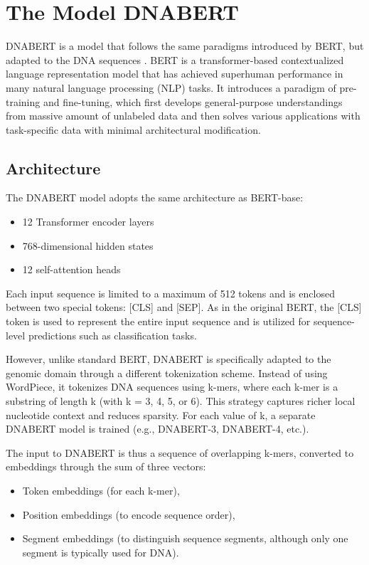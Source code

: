 \section{The Model DNABERT}

DNABERT is a model that follows the same paradigms introduced by BERT, but adapted to the DNA sequences \cite{DBLP:journals/corr/abs-1810-04805}.
BERT is a transformer-based contextualized language representation model that has achieved superhuman performance in many natural language processing (NLP) tasks. It introduces a paradigm of pre-training and fine-tuning, which first develops general-purpose understandings from massive amount of unlabeled data and then solves various applications with task-specific data with minimal architectural modification.


\subsection{Architecture}

The DNABERT model adopts the same architecture as BERT-base:
\begin{itemize}
    \item 12 Transformer encoder layers
    \item 768-dimensional hidden states
    \item 12 self-attention heads
\end{itemize} 

Each input sequence is limited to a maximum of 512 tokens and is enclosed between two special tokens: [CLS] and [SEP]. As in the original BERT, the [CLS] token is used to represent the entire input sequence and is utilized for sequence-level predictions such as classification tasks.

However, unlike standard BERT, DNABERT is specifically adapted to the genomic domain through a different tokenization scheme. Instead of using WordPiece, it tokenizes DNA sequences using k-mers, where each k-mer is a substring of length k (with k = 3, 4, 5, or 6). This strategy captures richer local nucleotide context and reduces sparsity. For each value of k, a separate DNABERT model is trained (e.g., DNABERT-3, DNABERT-4, etc.).

The input to DNABERT is thus a sequence of overlapping k-mers, converted to embeddings through the sum of three vectors:
\begin{itemize}
    \item Token embeddings (for each k-mer),
    \item Position embeddings (to encode sequence order),
    \item Segment embeddings (to distinguish sequence segments, although only one segment is typically used for DNA).
\end{itemize}

